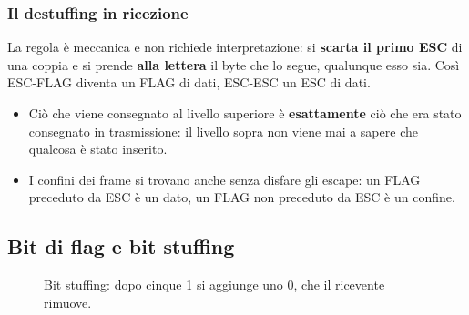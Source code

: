 \subsubsection*{Il destuffing in ricezione}

La regola è meccanica e non richiede interpretazione: si \textbf{scarta il primo ESC} di una coppia e si prende \textbf{alla lettera}
il byte che lo segue, qualunque esso sia. Così ESC-FLAG diventa un FLAG di dati, ESC-ESC un ESC di dati.

\begin{itemize}
    \item Ciò che viene consegnato al livello superiore è \textbf{esattamente} ciò che era stato consegnato in trasmissione: il livello
          sopra non viene mai a sapere che qualcosa è stato inserito.
    \item I confini dei frame si trovano anche senza disfare gli escape: un FLAG preceduto da ESC è un dato, un FLAG non preceduto da
          ESC è un confine.
\end{itemize}

\subsection{Bit di flag e bit stuffing}


\begin{figure}[H]
\centering
{}
\caption{Bit stuffing: dopo cinque 1 si aggiunge uno 0, che il ricevente rimuove.}
\end{figure}

